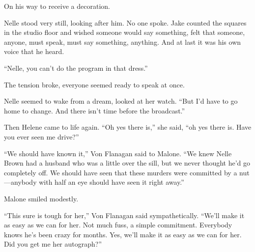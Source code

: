 \documentclass{novel}
\begin{document}
On his way to receive a decoration.

Nelle stood very still, looking after him. No one spoke. Jake counted the squares in the studio floor and wished someone would say something, felt that someone, anyone, must speak, must say something, anything. And at last it was his own voice that he heard.

“Nelle, you can’t do the program in that dress.”

The tension broke, everyone seemed ready to speak at once.

Nelle seemed to wake from a dream, looked at her watch. “But I’d have to go home to change. And there isn’t time before the broadcast.”

Then Helene came to life again. “Oh yes there is,” she said, “oh yes there is. Have you ever seen me drive?”

\vspace{2\nbs}
\clearpage
\thispagestyle{empty}

\begin{ChapterStart}
\vspace{3\nbs}
\end{ChapterStart}

“We should have known it,” Von Flanagan said to Malone. “We knew Nelle Brown had a husband who was a little over the sill, but we never thought he’d go completely off. We should have seen that these murders were committed by a nut—anybody with half an eye should have seen it right away.”

Malone smiled modestly.

“This sure is tough for her,” Von Flanagan said sympathetically. “We’ll make it as easy as we can for her. Not much fuss, a simple commitment. Everybody knows he’s been crazy for months. Yes, we’ll make it as easy as we can for her. Did you get me her autograph?”
\end{document}
